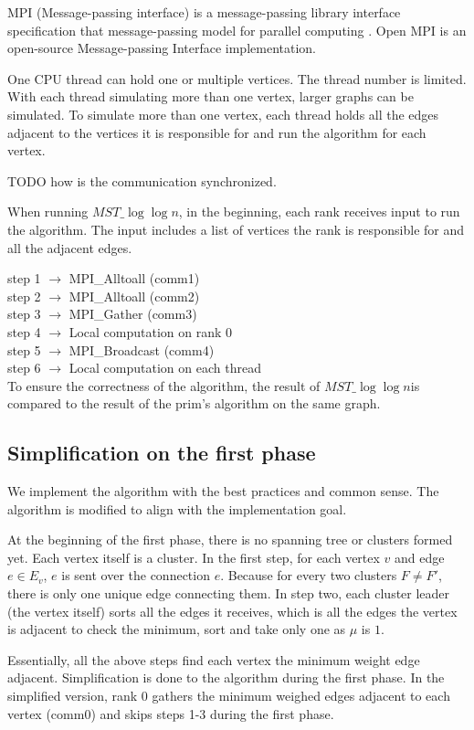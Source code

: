 \documentclass[english, 12pt, a4paper, elec, utf8, a-2b, online]{aaltothesis}
\newcommand{\mstalgo}{$MST\_\log\log{n}$}
\begin{document}
MPI (Message-passing interface) is a message-passing library interface specification that message-passing model for parallel computing \cite{MPI}. Open MPI is an open-source Message-passing Interface implementation. 

One CPU thread can hold one or multiple vertices. The thread number is limited. With each thread simulating more than one vertex, larger graphs can be simulated. To simulate more than one vertex, each thread holds all the edges adjacent to the vertices it is responsible for and run the algorithm for each vertex. 

TODO how is the communication synchronized.

When running \mstalgo, in the beginning, each rank receives input to run the algorithm.
The input includes a list of vertices the rank is responsible for and all the adjacent edges.

step 1 $\rightarrow$ MPI\_Alltoall (comm1)\\
step 2 $\rightarrow$ MPI\_Alltoall (comm2)\\
step 3 $\rightarrow$ MPI\_Gather (comm3)\\
step 4 $\rightarrow$ Local computation on rank 0\\
step 5 $\rightarrow$ MPI\_Broadcast (comm4)\\
step 6 $\rightarrow$ Local computation on each thread\\

To ensure the correctness of the algorithm, the result of \mstalgo is compared to the result of the prim's algorithm on the same graph.


\subsection{Simplification on the first phase}
We implement the algorithm with the best practices and common sense. The algorithm is modified to align with the implementation goal. 

At the beginning of the first phase, there is no spanning tree or clusters formed yet. Each vertex itself is a cluster. In the first step, for each vertex $v$ and edge $e \in E_v$, $e$ is sent over the connection $e$. 
Because for every two clusters $F \neq F'$, there is only one unique edge connecting them. 
In step two, each cluster leader (the vertex itself) sorts all the edges it receives, which is all the edges the vertex is adjacent to check the minimum, sort and take only one as $\mu$ is $1$. 

Essentially, all the above steps find each vertex the minimum weight edge adjacent. Simplification is done to the algorithm during the first phase. In the simplified version, rank 0 gathers the minimum weighed edges adjacent to each vertex (comm0) and skips steps 1-3 during the first phase. 
\end{document}
